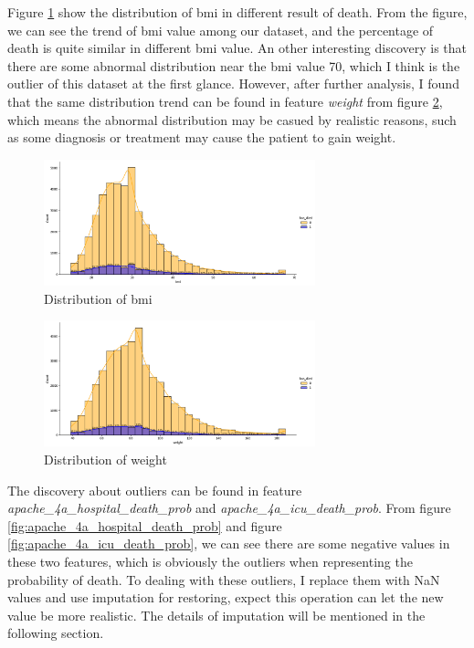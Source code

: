 \documentclass[a4paper, oneside, final, 12pt]{scrartcl} %
\begin{document}
Figure \ref{fig:bmi} show the distribution of bmi in different result of death.
From the figure, we can see the trend of bmi value among our dataset,
and the percentage of death is quite similar in different bmi value.
An other interesting discovery is that there are some abnormal distribution near the bmi value 70,
which I think is the outlier of this dataset at the first glance.
However, after further analysis, I found that the same distribution trend can be found in
feature \emph{weight} from figure \ref{fig:weight},
which means the abnormal distribution may be casued by realistic reasons,
such as some diagnosis or treatment may cause the patient to gain weight.

\begin{figure}[h]
  \centering
  \includegraphics[width=0.7\textwidth]{"./image/dataset/bmi_dis.png"}
  \caption{Distribution of bmi}
  \label{fig:bmi}
\end{figure}

\begin{figure}[h]
  \centering
  \includegraphics[width=0.7\textwidth]{"./image/dataset/weight_dis.png"}
  \caption{Distribution of weight}
  \label{fig:weight}
\end{figure}

\newpage

The discovery about outliers can be found in 
feature \emph{apache\_4a\_hospital\_death\_prob} and \emph{apache\_4a\_icu\_death\_prob}.
From figure \ref{fig:apache_4a_hospital_death_prob} and figure \ref{fig:apache_4a_icu_death_prob},
we can see there are some negative values in these two features,
which is obviously the outliers when representing the probability of death.
To dealing with these outliers, I replace them with NaN values and use imputation for restoring,
expect this operation can let the new value be more realistic.
The details of imputation will be mentioned in the following section.
\end{document}
